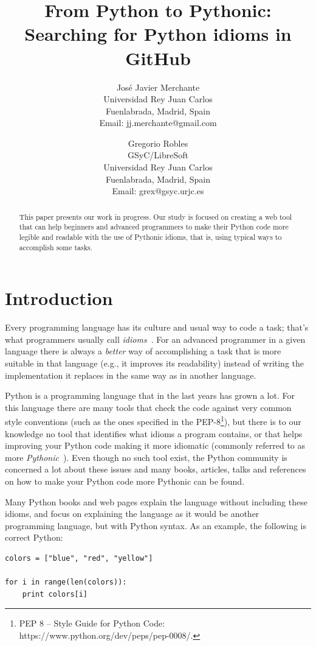 \documentclass[a4paper]{article}
\title{From Python to Pythonic:\\ Searching for Python idioms in GitHub}
\author{
Jos\'e Javier Merchante
 \\ 
Universidad Rey Juan Carlos\\
Fuenlabrada, Madrid, Spain\\
Email: jj.merchante@gmail.com
\and
Gregorio Robles \\ GSyC/LibreSoft\\
Universidad Rey Juan Carlos\\
Fuenlabrada, Madrid, Spain\\
Email: grex@gsyc.urjc.es
}
\begin{document}
\maketitle

\begin{abstract}
    This paper presents our work in progress. Our study is focused on creating a web tool that can help beginners and advanced programmers to make their Python code more legible and readable with the use of Pythonic idioms, that is, using typical ways to accomplish some tasks.
\end{abstract}

\section{Introduction}

Every programming language has its culture and usual way to code a task; that's what programmers usually call \emph{idioms}~\cite{coplien1997advanced}. For an advanced programmer in a given language there is always a \emph{better} way of accomplishing a task that is more suitable in that language (e.g., it improves its readability) instead of writing the implementation it replaces in the same way as in another language.

Python is a programming language that in the last years has grown a lot. For this language there are many tools that check the code against very common style conventions (such as the ones specified in the PEP-8\footnote{PEP 8 -- Style Guide for Python Code: https://www.python.org/dev/peps/pep-0008/.}), but there is to our knowledge no tool that identifies what idioms a program contains, or that helps improving your Python code making it more idiomatic (commonly referred to as more \emph{Pythonic}~\cite{van2007python}). Even though no such tool exist, the Python community is concerned a lot about these issues and many books, articles, talks and references on how to make your Python code more Pythonic can be found.

Many Python books and web pages explain the language without including these idioms, and focus on explaining the language as it would be another programming language, but with Python syntax. As an example, the following is correct Python:

\begin{verbatim}
colors = ["blue", "red", "yellow"]

for i in range(len(colors)):
    print colors[i]
\end{verbatim}
\end{document}
